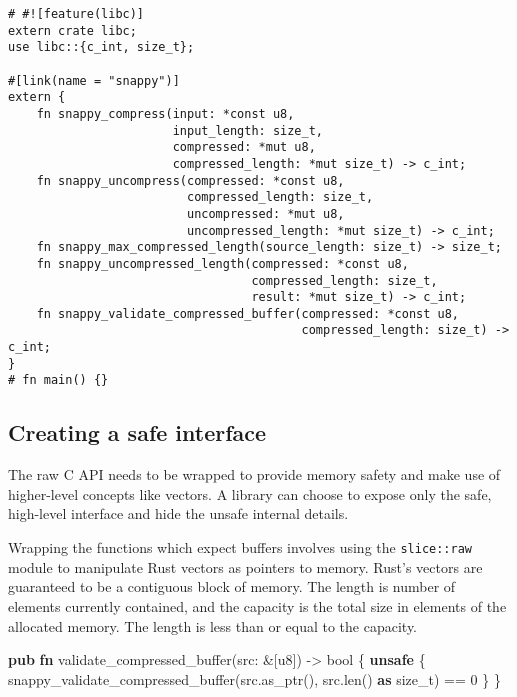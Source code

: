 \documentclass[a4paper,]{book}
\newenvironment{Shaded}{\begin{snugshade}}{\end{snugshade}}
\newcommand{\KeywordTok}[1]{\textcolor[rgb]{0.13,0.29,0.53}{\textbf{{#1}}}}
\newcommand{\DataTypeTok}[1]{\textcolor[rgb]{0.13,0.29,0.53}{{#1}}}
\newcommand{\DecValTok}[1]{\textcolor[rgb]{0.00,0.00,0.81}{{#1}}}
\newcommand{\NormalTok}[1]{{#1}}
\begin{document}
\begin{verbatim}
# #![feature(libc)]
extern crate libc;
use libc::{c_int, size_t};

#[link(name = "snappy")]
extern {
    fn snappy_compress(input: *const u8,
                       input_length: size_t,
                       compressed: *mut u8,
                       compressed_length: *mut size_t) -> c_int;
    fn snappy_uncompress(compressed: *const u8,
                         compressed_length: size_t,
                         uncompressed: *mut u8,
                         uncompressed_length: *mut size_t) -> c_int;
    fn snappy_max_compressed_length(source_length: size_t) -> size_t;
    fn snappy_uncompressed_length(compressed: *const u8,
                                  compressed_length: size_t,
                                  result: *mut size_t) -> c_int;
    fn snappy_validate_compressed_buffer(compressed: *const u8,
                                         compressed_length: size_t) -> c_int;
}
# fn main() {}
\end{verbatim}

\subsection{Creating a safe interface}\label{creating-a-safe-interface}

The raw C API needs to be wrapped to provide memory safety and make use
of higher-level concepts like vectors. A library can choose to expose
only the safe, high-level interface and hide the unsafe internal
details.

Wrapping the functions which expect buffers involves using the
\texttt{slice::raw} module to manipulate Rust vectors as pointers to
memory. Rust's vectors are guaranteed to be a contiguous block of
memory. The length is number of elements currently contained, and the
capacity is the total size in elements of the allocated memory. The
length is less than or equal to the capacity.

\begin{Shaded}
\begin{Highlighting}[]
\KeywordTok{pub} \KeywordTok{fn} \NormalTok{validate_compressed_buffer(src: &[}\DataTypeTok{u8}\NormalTok{]) -> }\DataTypeTok{bool} \NormalTok{\{}
    \KeywordTok{unsafe} \NormalTok{\{}
        \NormalTok{snappy_validate_compressed_buffer(src.as_ptr(), src.len() }\KeywordTok{as} \DataTypeTok{size_t}\NormalTok{) == }\DecValTok{0}
    \NormalTok{\}}
\NormalTok{\}}
\end{Highlighting}
\end{Shaded}
\end{document}

